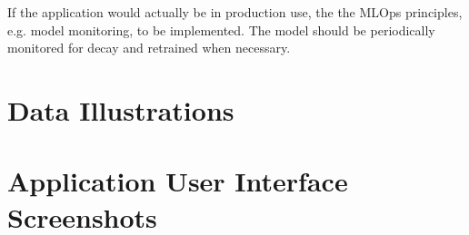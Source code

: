 \documentclass{article}
\begin{document}
If the application would actually be in production use, the the MLOps principles, e.g. model monitoring, to be implemented. The model should be periodically monitored for decay and retrained when necessary.


\appendix
\section{Data Illustrations}
\label{section:appendixa}



\section{Application User Interface Screenshots}
\label{section:appendixb}

\end{document}

